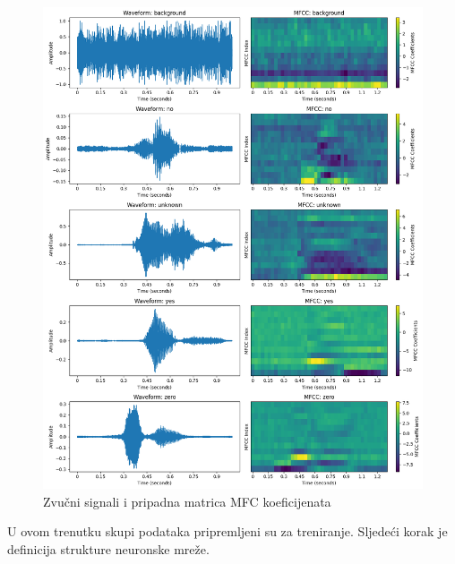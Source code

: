 \begin{figure}[htb]
    \centering
    \includegraphics[width=1\linewidth]{Chapters/neuronska_mreza/dataset/mfcc.png} 
    \caption{Zvučni signali i pripadna matrica MFC koeficijenata}
    \label{pic:mfccpython}
\end{figure}

U ovom trenutku skupi podataka pripremljeni su za treniranje. Sljedeći korak je definicija 
strukture neuronske mreže.